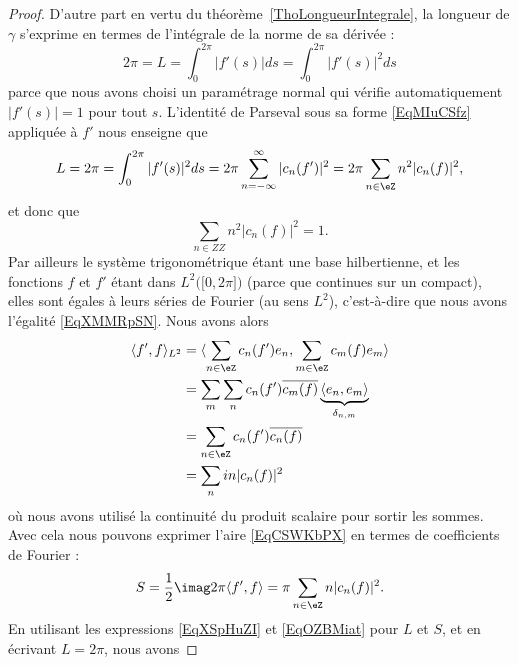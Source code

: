 \begin{proof}
	D'autre part en vertu du théorème~\ref{ThoLongueurIntegrale}, la longueur de \( \gamma\) s'exprime en termes de l'intégrale de la norme de sa dérivée :
	\begin{equation}
		2\pi=L=\int_0^{2\pi}| f'(s) |ds=\int_0^{2\pi}| f'(s) |^2ds
	\end{equation}
	parce que nous avons choisi un paramétrage normal qui vérifie automatiquement \( | f'(s) |=1\) pour tout \( s\). L'identité de Parseval sous sa forme \eqref{EqMIuCSfz} appliquée à \( f'\) nous enseigne que
	\begin{equation}        \label{EqXSpHuZI}
		L=2\pi=\int_0^{2\pi}| f'(s) |^2ds=2\pi\sum_{n=-\infty}^{\infty}| c_n(f') |^2=2\pi\sum_{n\in \eZ}n^2| c_n(f) |^2,
	\end{equation}
	et donc que
	\begin{equation}        \label{EQooAXAWooIgSDmu}
		\sum_{n\in ZZ}n^2| c_n(f) |^2=1.
	\end{equation}
	Par ailleurs le système trigonométrique étant une base hilbertienne, et les fonctions \( f\) et \( f'\) étant dans \( L^2\big( \mathopen[ 0 , 2\pi \mathclose] \big)\) (parce que continues sur un compact), elles sont égales à leurs séries de Fourier (au sens \( L^2\)), c'est-à-dire que nous avons l'égalité \eqref{EqXMMRpSN}. Nous avons alors
	\begin{subequations}
		\begin{align}
			\langle f', f\rangle_{L^2} & =\langle \sum_{n\in \eZ}c_n(f')e_n, \sum_{m\in \eZ}c_m(f)e_m\rangle                         \\
			                           & =\sum_m\sum_nc_n(f')\overline{ c_m(f) }\underbrace{\langle e_n, e_m\rangle }_{\delta_{n,m}} \\
			                           & =\sum_{n\in \eZ}c_n(f')\overline{ c_n(f) }                                                  \\
			                           & =\sum_nin| c_n(f) |^2
		\end{align}
	\end{subequations}
	où nous avons utilisé la continuité du produit scalaire pour sortir les sommes. Avec cela nous pouvons exprimer l'aire \eqref{EqCSWKbPX} en termes de coefficients de Fourier :
	\begin{equation}    \label{EqOZBMiat}
		S=\frac{ 1 }{2}\imag2\pi\langle f', f\rangle =\pi\sum_{n\in \eZ}n| c_n(f) |^2.
	\end{equation}
	En utilisant les expressions \eqref{EqXSpHuZI} et \eqref{EqOZBMiat} pour \( L\) et \( S\), et en écrivant \( L=2\pi \), nous avons

\end{proof}
